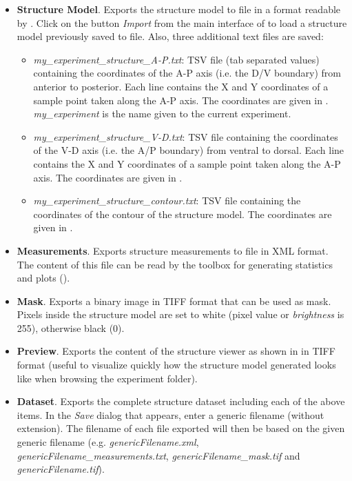 \begin{itemize}
 \item \textbf{Structure Model}. Exports the structure model to file in a format readable by \wingj. Click on the button \textit{Import} from the main interface of \wingj to load a structure model previously saved to file. Also, three additional text files are saved:
    \begin{itemize}
     \item \textit{my\_experiment\_structure\_A-P.txt}: TSV file (tab separated values) containing the coordinates of the A-P axis (i.e. the D/V boundary) from anterior to posterior. Each line contains the X and Y coordinates of a sample point taken along the A-P axis. The coordinates are given in \px. \textit{my\_experiment} is the name given to the current experiment.
     \item \textit{my\_experiment\_structure\_V-D.txt}: TSV file containing the coordinates of the V-D axis (i.e. the A/P boundary) from ventral to dorsal. Each line contains the X and Y coordinates of a sample point taken along the A-P axis. The coordinates are given in \px.
     \item \textit{my\_experiment\_structure\_contour.txt}: TSV file containing the coordinates of the contour of the structure model. The coordinates are given in \px.
    \end{itemize}
 \item \textbf{Measurements}. Exports structure measurements to file in XML format. The content of this file can be read by the \wingj \matlab toolbox for generating statistics and plots ().
 \item \textbf{Mask}. Exports a binary image in TIFF format that can be used as mask. Pixels inside the structure model are set to white (pixel value or \textit{brightness} is 255), otherwise black (0).
 \item \textbf{Preview}. Exports the content of the structure viewer as shown in  in TIFF format (useful to visualize quickly how the structure model generated looks like when browsing the experiment folder).
 \item \textbf{Dataset}. Exports the complete structure dataset including each of the above items. In the \textit{Save} dialog that appears, enter a generic filename (without extension). The filename of each file exported will then be based on the given generic filename (e.g. \textit{genericFilename.xml}, \textit{genericFilename\_measurements.txt}, \textit{genericFilename\_mask.tif} and \textit{genericFilename.tif}).
\end{itemize}

